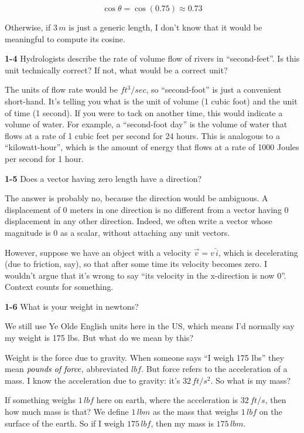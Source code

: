 \documentclass{amsart}
\begin{document}
\[
   \cos \theta = \cos(0.75) \approx 0.73
\]

Otherwise, if $3\, m$ is just a generic length, I don't know that it would be meaningful to compute its cosine.

\textbf{1-4} Hydrologists describe the rate of volume flow of rivers in ``second-feet''.
Is this unit technically correct?
If not, what would be a correct unit?

The units of flow rate would be $ft^{3}/sec$, so ``second-foot'' is just a convenient short-hand.
It's telling you what is the unit of volume (1 cubic foot) and the unit of time (1 second).
If you were to tack on another time, this would indicate a volume of water.
For example, a ``second-foot day'' is the volume of water that flows at a rate of 1 cubic feet per second for 24 hours.
This is analogous to a ``kilowatt-hour'', which is the amount of energy that flows at a rate of 1000 Joules per second for 1 hour.

\textbf{1-5} Does a vector having zero length have a direction?

The answer is probably no, because the direction would be ambiguous.
A displacement of 0 meters in one direction is no different from a vector having 0 displacement in any other direction.
Indeed, we often write a vector whose magnitude is 0 as a scalar, without attaching any unit vectors.

However, suppose we have an object with a velocity $\vec v = v \, \hat i$, which is decelerating (due to friction, say),
so that after some time its velocity becomes zero.
I wouldn't argue that it's wrong to say ``its velocity in the x-direction is now 0''.
Context counts for something.

\textbf{1-6} What is your weight in newtons?

We still use Ye Olde English units here in the US, which means I'd normally say my weight is 175 lbs.
But what do we mean by this?

Weight is the force due to gravity.
When someone says ``I weigh 175 lbs'' they mean $\emph{pounds of force}$, abbreviated $lbf$.
But force refers to the acceleration of a mass.  I know the acceleration due to gravity: it's $32 \, ft/s^{2}$.
So what is my mass?

If something weighs $1 \, lbf$ here on earth, where the acceleration is $32 \, ft/s$, then how much mass is that?
We define $1 \, lbm$ as the mass that weighs $1 \, lbf$ on the surface of the earth.
So if I weigh $175 \, lbf$, then my mass is $175 \, lbm$.
\end{document}
